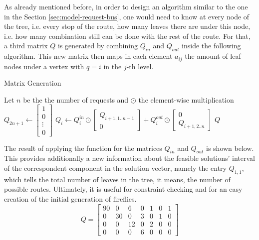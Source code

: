 \documentclass[tuberlin,cic,tc,openright,english,noabntcite,oneside]{iiufrgs}
\begin{document}
As already mentioned before, in order to design an algorithm similar to the one in the Section \ref{sec:model-request-bus}, one would need to know at every node of the tree, i.e. every stop of the route, how many leaves there are under this node, i.e. how many combination still can be done with the rest of the route. For that, a third matrix $Q$ is generated by combining $Q_{in}$ and $Q_{out}$ inside the following algorithm. This new matrix then maps in each element $a_{ij}$ the amount of leaf nodes under a vertex with $q=i$ in the $j$-th level.
\begin{algorithm}[H]
\caption{Matrix Generation}
\begin{algorithmic}
\State Let $n$ be the the number of requests and $\odot$ the element-wise multiplication
\State $\displaystyle Q_{2n+1} \gets \begin{bmatrix}1\\ 0 \\ \vdots \\0 \end{bmatrix}$
	\State $\displaystyle Q_{i} \gets Q^{in}_{i} \odot \begin{bmatrix}Q_{i+1,1..n-1} \\ 0\end{bmatrix}
	+ Q^{out}_{i} \odot \begin{bmatrix}0\\ Q_{i+1,2..n}\end{bmatrix}$
\EndFor
\State \Return $Q$
\EndFunction
\end{algorithmic}
\end{algorithm}

The result of applying the function for the matrices $Q_{in}$ and $Q_{out}$ is shown below. This provides additionally a new information about the feasible solutions' interval of the correspondent component in the solution vector, namely the entry $Q_{1,1}$, which tells the total number of leaves in the tree, it means, the number of possible routes. Ultimately, it is useful for constraint checking and for an easy creation of the initial generation of fireflies.
$$
Q = 
\begin{bmatrix}
90 & 0 & 6 & 0 & 1 & 0 & 1\\
0 & 30 & 0 & 3 & 0 & 1 & 0\\
0 & 0 & 12 & 0 & 2 & 0 & 0\\
0 & 0 & 0 & 6 & 0 & 0 & 0
\end{bmatrix}
$$
\end{document}
